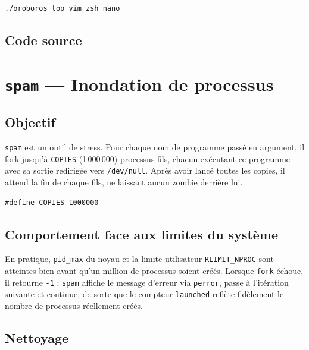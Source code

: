 \documentclass[12pt,a4paper]{article}
\begin{document}
\begin{lstlisting}[language=bash, style=cstyle]
./oroboros top vim zsh nano
\end{lstlisting}

\subsection{Code source}



\section{\texttt{spam} --- Inondation de processus}

\subsection{Objectif}

\texttt{spam} est un outil de stress. Pour chaque nom de programme passé en
argument, il fork jusqu'à \texttt{COPIES} (1\,000\,000) processus fils,
chacun exécutant ce programme avec sa sortie redirigée vers \texttt{/dev/null}.
Après avoir lancé toutes les copies, il attend la fin de chaque fils,
ne laissant aucun zombie derrière lui.

\begin{lstlisting}[caption={Constante définissant le nombre de copies}]
#define COPIES 1000000
\end{lstlisting}

\subsection{Comportement face aux limites du système}

En pratique, \texttt{pid\_max} du noyau et la limite utilisateur
\texttt{RLIMIT\_NPROC} sont atteintes bien avant qu'un million de processus
soient créés. Lorsque \texttt{fork} échoue, il retourne \texttt{-1} ;
\texttt{spam} affiche le message d'erreur via \texttt{perror}, passe à
l'itération suivante et continue, de sorte que le compteur \texttt{launched}
reflète fidèlement le nombre de processus réellement créés.

\subsection{Nettoyage}
\end{document}

